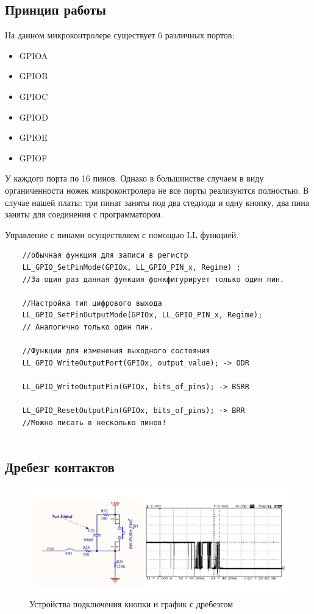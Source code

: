 \subsection{Принцип работы}

На данном микроконтролере существует 6 различных портов:
\begin{itemize}
    \item GPIOA
    \item GPIOB
    \item GPIOC
    \item GPIOD
    \item GPIOE
    \item GPIOF
\end{itemize}   

У каждого порта по 16 пинов. Однако в большинстве случаем в виду органиченности ножек микроконтролера не все порты реализуются полностью. В случае нашей платы: три пинат заняты под два стедиода и одну кнопку, два пина заняты для соединения с программатором. 


Управление с пинами осуществляем с помощью LL функцией.

\begin{verbatim}
    //обычная функция для записи в регистр
    LL_GPIO_SetPinMode(GPIOx, LL_GPIO_PIN_x, Regime) ;
    //За один раз данная функция фонкфигурирует только один пин.

    //Настройка тип цифрового выхода
    LL_GPIO_SetPinOutputMode(GPIOx, LL_GPIO_PIN_x, Regime);
    // Аналогично только один пин.
    
    //Функции для изменения выходного состояния
    LL_GPIO_WriteOutputPort(GPIOx, output_value); -> ODR
    
    LL_GPIO_WriteOutputPin(GPIOx, bits_of_pins); -> BSRR
    
    LL_GPIO_ResetOutputPin(GPIOx, bits_of_pins); -> BRR
    //Можно писать в несколько пинов!
    

\end{verbatim}


\subsection{Дребезг контактов}


\begin{figure}[h!]
		\centering
		\includegraphics[width=1\linewidth]{pics/drebezg.png}
		\caption{Устройства подключения кнопки и график с дребезгом}
		\label{drebezg}
\end{figure}

